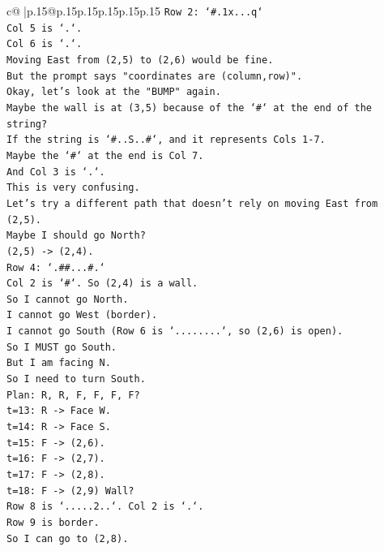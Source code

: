 \documentclass{article}
\begin{document}
{\begin{supertabular}{c@{$\;$}|p{.15\linewidth}@{}p{.15\linewidth}p{.15\linewidth}p{.15\linewidth}p{.15\linewidth}p{.15\linewidth}}
{{{\texttt{Row 2: `\#.1x...q`} \\
\texttt{Col 5 is `.`.} \\
\texttt{Col 6 is `.`.} \\
\texttt{Moving East from (2,5) to (2,6) would be fine.} \\
\texttt{But the prompt says "coordinates are (column,row)".} \\
\texttt{Okay, let's look at the "BUMP" again.} \\
\texttt{Maybe the wall is at (3,5) because of the `\#` at the end of the string?} \\
\texttt{If the string is `\#..S..\#`, and it represents Cols 1{-}7.} \\
\texttt{Maybe the `\#` at the end is Col 7.} \\
\texttt{And Col 3 is `.`.} \\
\texttt{This is very confusing.} \\
\texttt{Let's try a different path that doesn't rely on moving East from (2,5).} \\
\texttt{Maybe I should go North?} \\
\texttt{(2,5) {-}> (2,4).} \\
\texttt{Row 4: `.\#\#...\#.`} \\
\texttt{Col 2 is `\#`. So (2,4) is a wall.} \\
\texttt{So I cannot go North.} \\
\texttt{I cannot go West (border).} \\
\texttt{I cannot go South (Row 6 is `........`, so (2,6) is open).} \\
\texttt{So I MUST go South.} \\
\texttt{But I am facing N.} \\
\texttt{So I need to turn South.} \\
\texttt{Plan: R, R, F, F, F, F?} \\
\texttt{t=13: R {-}> Face W.} \\
\texttt{t=14: R {-}> Face S.} \\
\texttt{t=15: F {-}> (2,6).} \\
\texttt{t=16: F {-}> (2,7).} \\
\texttt{t=17: F {-}> (2,8).} \\
\texttt{t=18: F {-}> (2,9) Wall?} \\
\texttt{Row 8 is `.....2..`. Col 2 is `.`.} \\
\texttt{Row 9 is border.} \\
\texttt{So I can go to (2,8).} \\
}}}
\end{supertabular}}
\end{document}
